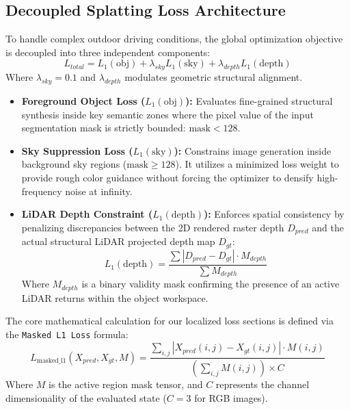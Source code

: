 \documentclass{article}
\begin{document}
\subsection{Decoupled Splatting Loss Architecture}
To handle complex outdoor driving conditions, the global optimization objective is decoupled into three independent components:
\begin{equation}
    L_{total} = L_{1}(\text{obj}) + \lambda_{sky} L_{1}(\text{sky}) + \lambda_{depth} L_{1}(\text{depth})
\end{equation}
Where $\lambda_{sky} = 0.1$ and $\lambda_{depth}$ modulates geometric structural alignment.
\begin{itemize}
    \item \textbf{Foreground Object Loss ($L_{1}(\text{obj})$):} Evaluates fine-grained structural synthesis inside key semantic zones where the pixel value of the input segmentation mask is strictly bounded: $\text{mask} < 128$.
    \item \textbf{Sky Suppression Loss ($L_{1}(\text{sky})$):} Constrains image generation inside background sky regions ($\text{mask} \ge 128$). It utilizes a minimized loss weight to provide rough color guidance without forcing the optimizer to densify high-frequency noise at infinity.
    \item \textbf{LiDAR Depth Constraint ($L_{1}(\text{depth})$):} Enforces spatial consistency by penalizing discrepancies between the 2D rendered raster depth $D_{pred}$ and the actual structural LiDAR projected depth map $D_{gt}$:
    \begin{equation}
        L_{1}(\text{depth}) = \frac{\sum |D_{pred} - D_{gt}| \cdot M_{depth}}{\sum M_{depth}}
    \end{equation}
    Where $M_{depth}$ is a binary validity mask confirming the presence of an active LiDAR returns within the object workspace.
\end{itemize}

The core mathematical calculation for our localized loss sections is defined via the \texttt{Masked L1 Loss} formula:
\begin{equation}
    L_{\text{masked\_l1}}(X_{pred}, X_{gt}, M) = \frac{\sum_{i,j} | X_{pred}(i,j) - X_{gt}(i,j) | \cdot M(i,j)}{\left(\sum_{i,j} M(i,j)\right) \times C}
\end{equation}
Where $M$ is the active region mask tensor, and $C$ represents the channel dimensionality of the evaluated state ($C=3$ for RGB images).
\end{document}
